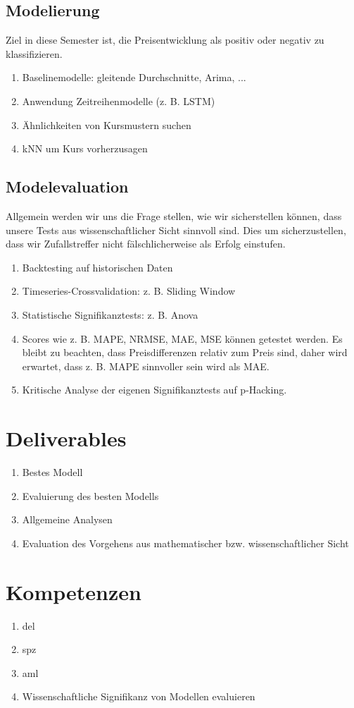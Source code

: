 \documentclass[a4paper,10pt]{article}
\begin{document}
\subsection{Modelierung}

Ziel in diese Semester ist, die Preisentwicklung als positiv oder negativ zu klassifizieren.

\begin{enumerate}
    \item Baselinemodelle: gleitende Durchschnitte, Arima, ...
    \item Anwendung Zeitreihenmodelle (z. B. LSTM)
    \item Ähnlichkeiten von Kursmustern suchen
    \item kNN um Kurs vorherzusagen
\end{enumerate}

\subsection{Modelevaluation}

Allgemein werden wir uns die Frage stellen, wie wir sicherstellen können, dass unsere Tests aus wissenschaftlicher Sicht sinnvoll sind. Dies um sicherzustellen, dass wir Zufallstreffer nicht fälschlicherweise als Erfolg einstufen.

\begin{enumerate}
    \item Backtesting auf historischen Daten
    \item Timeseries-Crossvalidation: z. B. Sliding Window
    \item Statistische Signifikanztests: z. B. Anova
    \item Scores wie z. B. MAPE, NRMSE, MAE, MSE können getestet werden. Es bleibt zu beachten, dass Preisdifferenzen relativ zum Preis sind, daher wird erwartet, dass z. B. MAPE sinnvoller sein wird als MAE.
    \item Kritische Analyse der eigenen Signifikanztests auf p-Hacking.
\end{enumerate}

\section{Deliverables}


\begin{enumerate}
    \item Bestes Modell
    \item Evaluierung des besten Modells
    \item Allgemeine Analysen
    \item Evaluation des Vorgehens aus mathematischer bzw. wissenschaftlicher Sicht
\end{enumerate}

\section{Kompetenzen}

\begin{enumerate}
    \item del
    \item spz
    \item aml
    \item Wissenschaftliche Signifikanz von Modellen evaluieren
\end{enumerate}

\end{document}
